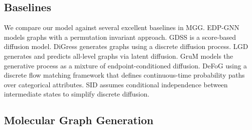 \documentclass[journal,twoside,web]{ieeecolor}
\begin{document}


\subsection{Baselines}
We compare our model against several excellent baselines in MGG. 
EDP-GNN \cite{niu2020permutation} models graphs with a permutation invariant approach. 
GDSS \cite{jo2022score} is a score-based diffusion model. 
DiGress \cite{vignac2023digress} generates graphs using a discrete diffusion process. 
LGD \cite{zhou2024unifying} generates and predicts all-level graphs via latent diffusion.
GruM \cite{jo2024graph} models the generative process as a mixture of endpoint-conditioned diffusion.
DeFoG \cite{qinmadeira2024defog} using a discrete flow matching framework that defines continuous-time probability paths over categorical attributes.
SID \cite{boget2025simple} assumes conditional independence between intermediate states to simplify discrete diffusion.


\subsection{Molecular Graph Generation}
\end{document}
